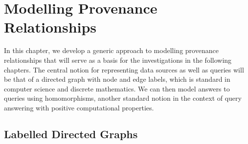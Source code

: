 
\chapter{Modelling Provenance Relationships}

In this chapter, we develop a generic approach to modelling provenance relationships
that will serve as a basis for the investigations in the following chapters.
The central notion for representing data sources
as well as queries will be that of a directed graph with node and edge labels,
which is standard in computer science and discrete mathematics.
We can then model answers to queries using homomorphisms,
another standard notion in the context of query answering with positive computational properties.



\section{Labelled Directed Graphs}

